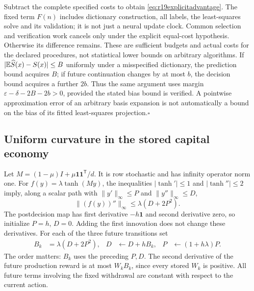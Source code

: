 Subtract the complete specified costs to obtain
\eqref{eq:r19explicitadvantage}. The fixed term $F(n)$ includes dictionary
construction, all labels, the least-squares solve and its validation; it is
not just a neural update clock. Common selection and verification work
cancels only under the explicit equal-cost hypothesis. Otherwise its
difference remains. These are sufficient budgets and actual costs for the
declared procedures, not statistical lower bounds on arbitrary algorithms.
If $|\mathbb E\widehat S(x)-S(x)|\leq B$ uniformly under a misspecified dictionary,
the prediction bound acquires $B$; if future continuation changes by at most
$b$, the decision bound acquires a further $2b$. Thus the same argument
uses margin $\varepsilon-\delta-2B-2b>0$, provided the stated bias bound is
verified. A pointwise approximation error of an arbitrary basis expansion
is not automatically a bound on the bias of its fitted least-squares
projection.\hfill$\square$

\subsection{Uniform curvature in the stored capital economy}
\label{app:r19curvature}
Let $M=(1-\mu)I+\mu\bm1\bm1^{\mathsf T}/d$. It is row stochastic and
has infinity operator norm one. For $f(y)=\lambda\tanh(My)$, the inequalities
$|\tanh'|\leq1$ and $|\tanh''|\leq2$ imply, along a scalar path with
$\|y'\|_\infty\leq P$ and $\|y''\|_\infty\leq D$,
\begin{equation}
 \|(f(y))''\|_\infty\leq\lambda(D+2P^2).
 \label{eq:r19prodcurv}
\end{equation}
The postdecision map has first derivative $-h\bm1$ and second derivative
zero, so initialize $P=h$, $D=0$. Adding the first innovation does not
change these derivatives. For each of the three future transitions set
\begin{align*}
 B_k&=\lambda(D+2P^2),&
 D&\leftarrow D+hB_k,&P&\leftarrow(1+h\lambda)P.
\end{align*}
The order matters: $B_k$ uses the preceding $P,D$. The second derivative of
the future production reward is at most $W_kB_k$, since every stored $W_k$
is positive. All future terms involving the fixed withdrawal are constant
with respect to the current action.

